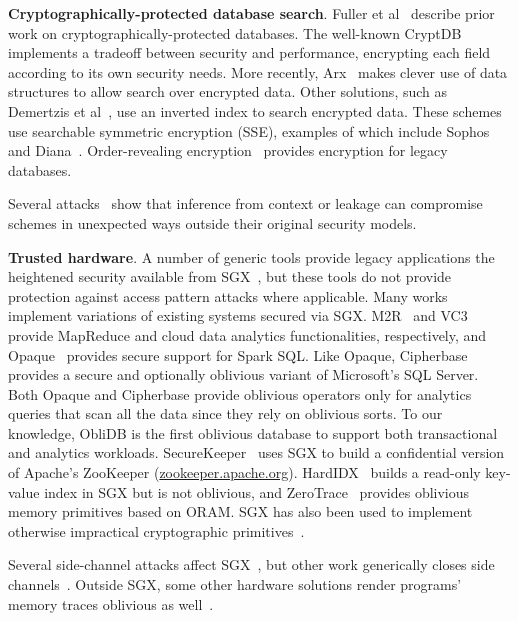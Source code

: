 \documentclass[letterpaper,twocolumn,10pt]{article}
\def\name/{ObliDB}
\begin{document}
  \noindent \textbf{Cryptographically-protected database search}.
Fuller et al~\cite{FVY+17} describe prior work on cryptographically-protected databases. The well-known CryptDB~\cite{PRZB12} implements a tradeoff between security and performance, encrypting each field according to its own security needs. More recently, Arx~\cite{PBP16} makes clever use of data structures to allow search over encrypted data. Other solutions, such as Demertzis et al~\cite{DPP+16}, use an inverted index to search encrypted data. These schemes use searchable symmetric encryption (SSE), examples of which include Sophos and Diana~\cite{Bost16, BMO17}. Order-revealing encryption~\cite{BLR+15, LW16} provides encryption for legacy databases.

Several attacks~\cite{IKK12, NKW15, CGPR15, ZKP16} show that inference from context or leakage can compromise schemes in unexpected ways outside their original security models.

  \noindent \textbf{Trusted hardware}.
A number of generic tools provide legacy applications the heightened security available from SGX~\cite{BPH15, STTS17, ATG+16, HZX+16}, but these tools do not provide protection against access pattern attacks where applicable.
Many works implement variations of existing systems secured via SGX. M2R~\cite{DSC+15} and VC3~\cite{SCF+15} provide MapReduce and cloud data analytics functionalities, respectively, and Opaque~\cite{ZDB+17} provides secure support for Spark SQL. Like Opaque, Cipherbase~\cite{cipherbase} provides a secure and optionally oblivious variant of Microsoft's SQL Server. Both Opaque and Cipherbase provide oblivious operators only for analytics queries that scan all the data since they rely on oblivious sorts. To our knowledge, \name/ is the first oblivious database to support both transactional and analytics workloads. SecureKeeper~\cite{BWG+16} uses SGX to build a confidential version of Apache's ZooKeeper (\url{zookeeper.apache.org}). HardIDX~\cite{FBB+17} builds a read-only key-value index in SGX but is not oblivious, and ZeroTrace~\cite{SGF17} provides oblivious memory primitives based on ORAM. SGX has also been used to implement otherwise impractical cryptographic primitives~\cite{FVBG16, NFR+17}.

Several side-channel attacks affect SGX~\cite{XCP15, BMD+17, LSG+16, WKPK16}, but other work generically closes side channels~\cite{SLKP17, SCNS16, RLT15, SLK+17}. Outside SGX, some other hardware solutions render programs' memory traces oblivious as well~\cite{CLD16, LHM+15, MLS+13}.
\end{document}
